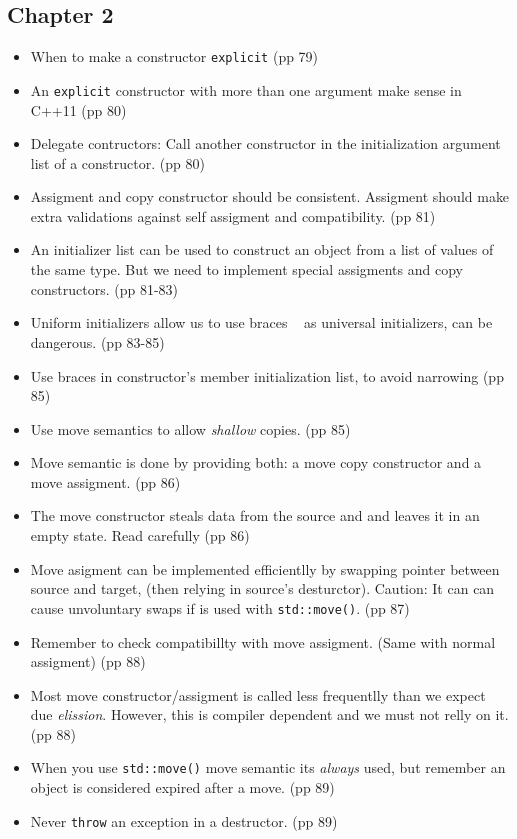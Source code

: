 \subsection{Chapter 2}
\begin{itemize}
 \item When to make a constructor \texttt{explicit} (pp 79)
 \item An \texttt{explicit} constructor with more than one argument make sense in C++11 (pp 80)
 \item Delegate contructors: Call another constructor in the initialization argument list of a constructor. (pp 80)
 \item Assigment and copy constructor should be consistent. Assigment should make extra validations against self assigment and compatibility. (pp 81)
 \item An initializer list can be used to construct an object from a list of values of the same type. But we need to implement special assigments and copy constructors. (pp 81-83)
 \item Uniform initializers allow us to use braces \texttt{{ }} as universal initializers, can be dangerous. (pp 83-85)
 \item Use braces in constructor's member initialization list, to avoid narrowing (pp 85)
 \item Use move semantics to allow \emph{shallow} copies. (pp 85)
 \item Move semantic is done by providing both: a move copy constructor and a move assigment. (pp 86)
 \item The move constructor steals data from the source and and leaves it in an empty state. Read carefully (pp 86)
 \item Move asigment can be implemented efficientlly by swapping pointer between source and target, (then relying in source's desturctor). Caution: It can can cause unvoluntary swaps if is used with \texttt{std::move()}. (pp 87)
 \item Remember to check compatibillty with move assigment. (Same with normal assigment) (pp 88)
 \item Most move constructor/assigment is called less frequentlly than we expect due \emph{elission}. However, this is compiler dependent and we must not relly on it. (pp 88)
 \item When you use \texttt{std::move()} move semantic its \emph{always} used, but remember an object is considered expired after a move. (pp 89)
 \item Never \texttt{throw} an exception in a destructor. (pp 89)

\end{itemize}
